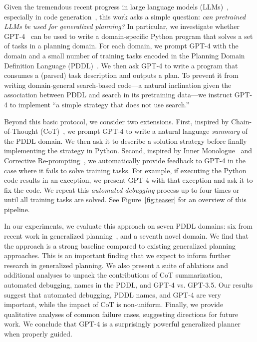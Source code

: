 \documentclass[letterpaper]{article} %
\begin{document}
Given the tremendous recent progress in large language models (LLMs)~\citep{brown2020language,chen2021evaluating,chowdhery2022palm}, especially in code generation~\cite{chen2021evaluating,nijkamp2023codegen,chen2023improving}, this work asks a simple question: \emph{can pretrained LLMs be used for generalized planning?}
In particular, we investigate whether GPT-4~\cite{openai2023gpt4} can be used to write a domain-specific Python program that solves a set of tasks in a planning domain.
For each domain, we prompt GPT-4 with the domain and a small number of training tasks encoded in the Planning Domain Definition Language (PDDL)~\cite{mcdermott-aimag2000}.
We then ask GPT-4 to write a program that consumes a (parsed) task description and outputs a plan.
To prevent it from writing domain-general search-based code---a natural inclination given the association between PDDL and search in its pretraining data---we instruct GPT-4 to implement ``a simple strategy that does not use search.''


Beyond this basic protocol, we consider two extensions.
First, inspired by Chain-of-Thought (CoT)~\cite{wei2022chain,jiang2023self}, we prompt GPT-4 to write a natural language \emph{summary} of the PDDL domain.
We then ask it to describe a solution strategy before finally implementing the strategy in Python.
Second, inspired by Inner Monologue~\cite{huang2022inner} and Corrective Re-prompting~\cite{raman2022planning}, we automatically provide feedback to GPT-4 in the case where it fails to solve training tasks.
For example, if executing the Python code results in an exception, we present GPT-4 with that exception and ask it to fix the code.
We repeat this \emph{automated debugging} process up to four times or until all training tasks are solved.
See Figure~\ref{fig:teaser} for an overview of this pipeline.

In our experiments, we evaluate this approach on seven PDDL domains: six from recent work in generalized planning~\cite{yang2022pg3}, and a seventh novel domain.
We find that the approach is a strong baseline compared to existing generalized planning approaches.
This is an important finding that we expect to inform further research in generalized planning.
We also present a suite of ablations and additional analyses to unpack the contributions of CoT summarization, automated debugging, names in the PDDL, and GPT-4 vs. GPT-3.5.
Our results suggest that automated debugging, PDDL names, and GPT-4 are very important, while the impact of CoT is non-uniform.
Finally, we provide qualitative analyses of common failure cases, suggesting directions for future work.
We conclude that GPT-4 is a surprisingly powerful generalized planner when properly guided.
\end{document}
